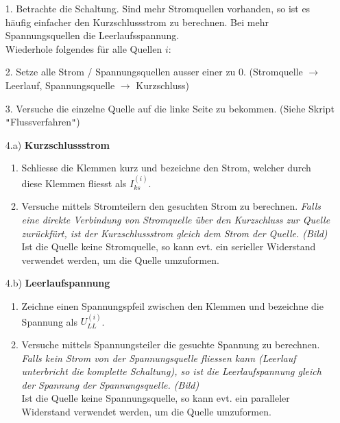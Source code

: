 \newpage
{}
\beginvor
\begin{itemize}

	\item[1.] Betrachte die Schaltung. Sind mehr Stromquellen vorhanden, so ist es häufig einfacher den Kurzschlussstrom zu berechnen. Bei mehr Spannungsquellen die Leerlaufsspannung. \\
	      Wiederhole folgendes für alle Quellen $i$: \\
\end{itemize}
\beginip
\begin{itemize}

	\item [2.  ]  Setze alle Strom / Spannungsquellen ausser einer zu 0. (Stromquelle $\rightarrow$ Leerlauf, Spannungsquelle $\rightarrow$ Kurzschluss)
	\item[3. ] Versuche die einzelne Quelle auf die linke Seite zu bekommen. (Siehe Skript \texttt{"}Flussverfahren\texttt{"})
	\item[4.a)] \textbf{Kurzschlussstrom}
	      \begin{enumerate}
	      	\item Schliesse die Klemmen kurz und bezeichne den Strom, welcher durch diese Klemmen fliesst als $I_{ks}^{(i)}$.
	      	\item Versuche mittels Stromteilern den gesuchten Strom zu berechnen. \textit{Falls eine direkte Verbindung von Stromquelle über den Kurzschluss zur Quelle zurückfürt, ist der Kurzschlussstrom gleich dem Strom der Quelle. (Bild)}\\
	      	      Ist die Quelle keine Stromquelle, so kann evt. ein serieller Widerstand verwendet werden, um die Quelle umzuformen.
	      \end{enumerate}
	\item[4.b)] \textbf{Leerlaufspannung}
	      \begin{enumerate}
	      	\item Zeichne einen Spannungspfeil zwischen den Klemmen und bezeichne die Spannung als $U_{LL}^{(i)}$.
	      	\item Versuche mittels Spannungsteiler die gesuchte Spannung zu berechnen. \textit{Falls kein Strom von der Spannungsquelle fliessen kann (Leerlauf unterbricht die komplette Schaltung), so ist die Leerlaufspannung gleich der Spannung der Spannungsquelle. (Bild)} \\
	      	      Ist die Quelle keine Spannungsquelle, so kann evt. ein paralleler Widerstand verwendet werden, um die Quelle umzuformen.
	      \end{enumerate}
\end{itemize}

